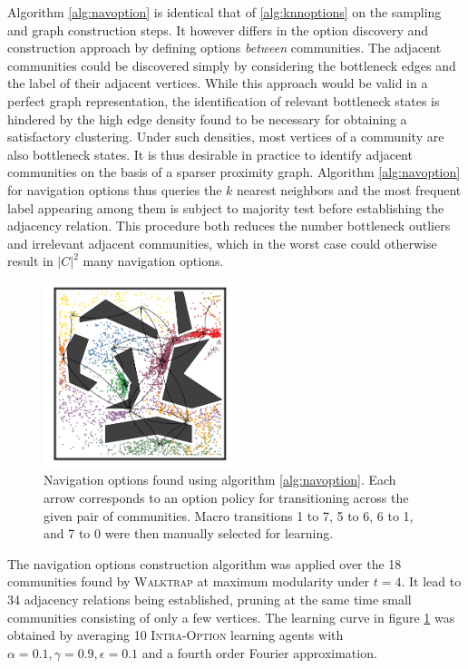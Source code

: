 Algorithm \ref{alg:navoption} is identical that of \ref{alg:knnoptions} on the sampling and graph construction steps. It however differs in the option discovery and construction approach by defining options \textit{between} communities. The adjacent communities could be discovered simply by considering the bottleneck edges and the label of their adjacent vertices. While this approach would be valid in a perfect graph representation, the identification of relevant bottleneck states is hindered by the high edge density found to be necessary for obtaining a satisfactory clustering. Under such densities, most vertices of a community are also bottleneck states. It is thus desirable in practice to identify adjacent communities on the basis of a sparser proximity graph. Algorithm \ref{alg:navoption} for navigation options thus queries the $k$ nearest neighbors and the most frequent label appearing among them is subject to majority test before establishing the adjacency relation. This procedure both reduces the number bottleneck outliers and irrelevant adjacent communities, which in the worst case could otherwise result in $|C|^2$ many navigation options.

\begin{figure}
\centering
\includegraphics[width=0.49\textwidth]{fig/pinball-nav.pdf}
\caption{Navigation options found using algorithm \ref{alg:navoption}. Each arrow corresponds to an option policy for transitioning across the given pair of communities. Macro transitions 1 to 7, 5 to 6, 6 to 1, and 7 to 0 were then manually selected for learning.}
\label{fig:nav-options}
\end{figure}

The navigation options construction algorithm was applied over the 18 communities found by \textsc{Walktrap} at maximum modularity under $t=4$. It lead to 34 adjacency relations being established, pruning at the same time small communities consisting of only a few vertices. The learning curve in figure \ref{fig:nav-options} was obtained by averaging 10 \textsc{Intra-Option} learning agents with $\alpha = 0.1, \gamma = 0.9, \epsilon = 0.1$ and a fourth order Fourier approximation. 

